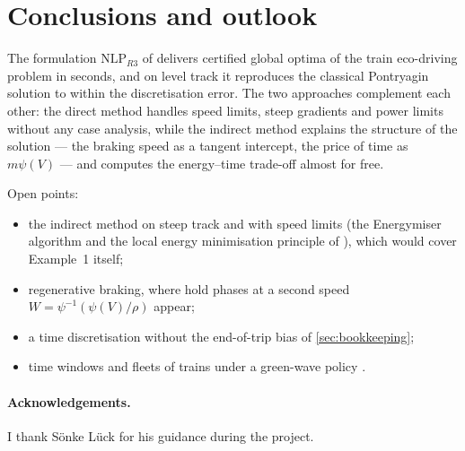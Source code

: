 \documentclass[11pt,a4paper]{article}
\newcommand{\NLP}{\text{NLP}_{R3}}
\begin{document}
\section{Conclusions and outlook}

The formulation $\NLP$ of \citet{Xiao2025} delivers certified global optima of the train eco-driving problem in seconds,
and on level track it reproduces the classical Pontryagin solution to within the discretisation error. The two
approaches complement each other: the direct method handles speed limits, steep gradients and power limits without
any case analysis, while the indirect method explains the structure of the solution --- the braking speed as a tangent
intercept, the price of time as $m\psi(V)$ --- and computes the energy--time trade-off almost for free.

Open points:
\begin{itemize}
  \item the indirect method on steep track and with speed limits (the Energymiser algorithm and the local energy
        minimisation principle of \citealp{Albrecht2016b}), which would cover Example~1 itself;
  \item regenerative braking, where hold phases at a second speed $W = \psi^{-1}(\psi(V)/\rho)$ appear;
  \item a time discretisation without the end-of-trip bias of \cref{sec:bookkeeping};
  \item time windows and fleets of trains under a green-wave policy \citep[Secs.~4--5]{Xiao2025}.
\end{itemize}

\paragraph{Acknowledgements.} I thank Sönke Lück for his guidance during the project.



\end{document}
